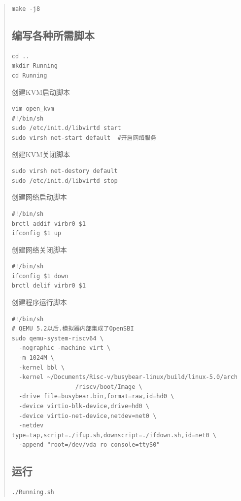 \begin{abstract}
\begin{sloppypar}
\begin{lstlisting}
make -j8
\end{lstlisting}

\subsection*{编写各种所需脚本}
\begin{lstlisting}
cd ..
mkdir Running
cd Running
\end{lstlisting}
创建KVM启动脚本
\begin{lstlisting}
vim open_kvm
#!/bin/sh
sudo /etc/init.d/libvirtd start
sudo virsh net-start default  #开启网络服务
\end{lstlisting}

创建KVM关闭脚本
\begin{lstlisting}
sudo virsh net-destory default
sudo /etc/init.d/libvirtd stop
\end{lstlisting}


创建网络启动脚本
\begin{lstlisting}
#!/bin/sh
brctl addif virbr0 $1
ifconfig $1 up
\end{lstlisting}

创建网络关闭脚本
\begin{lstlisting}
#!/bin/sh
ifconfig $1 down
brctl delif virbr0 $1
\end{lstlisting}

创建程序运行脚本
\begin{lstlisting}
#!/bin/sh
# QEMU 5.2以后.模拟器内部集成了OpenSBI
sudo qemu-system-riscv64 \
  -nographic -machine virt \
  -m 1024M \
  -kernel bbl \
  -kernel ~/Documents/Risc-v/busybear-linux/build/linux-5.0/arch
                  /riscv/boot/Image \
  -drive file=busybear.bin,format=raw,id=hd0 \
  -device virtio-blk-device,drive=hd0 \
  -device virtio-net-device,netdev=net0 \
  -netdev type=tap,script=./ifup.sh,downscript=./ifdown.sh,id=net0 \
  -append "root=/dev/vda ro console=ttyS0"
\end{lstlisting}

\subsection*{运行}
\begin{lstlisting}
./Running.sh
\end{lstlisting}


\end{sloppypar}
\end{abstract}
